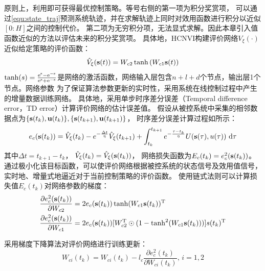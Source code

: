 原则上，利用即可获得最优控制策略。等号右侧的第一项为积分奖赏项，
可以通过\eqref{equ:state_traj}预测系统轨迹，并在求解轨迹上同时对效用函数进行积分以近似$[0:H]$之间的控制代价。
第二项为无穷积分项，无法显式求解。因此本章引入值函数近似的方法以评估未来的积分奖赏项。
具体地，HCNVI构建评价网络$V_\xi(\cdot)$近似给定策略的评价函数：
\begin{equation}
\label{equ:criticNN} \hat { V }_\xi ( \mathbf s(t) ) = W _ { c 2 } \tanh \left( W _
{ c 1 }  \mathbf s(t)  \right)
\end{equation}
$\tanh(s)=\frac{\rm e^{s}-\rm e^{-s}}{\rm e^{s}+\rm
e^{-s}}$是网络的激活函数，网络输入层包含$n+l+d$个节点，输出层1个节点。网络参数
为了保证算法参数更新的实时性，采用系统在线控制过程中产生的增量数据训练网络。
具体地，采用单步时序差分误差（Temporal difference error，TD error）\cite{Sutton2018}计算评价网络的估计误差值。
假设从被控系统中采集的相邻数据点为$\{\mathbf s(t_k), \mathbf u(t_k)\},\{\mathbf s(t_{k+1}), \mathbf u(t_{k+1})\}$，
时序差分误差计算过程如所示：
\begin{equation}
\label{equ:TDerror} e_{c }(\mathbf s(t_k))=\hat{V}_{\xi}(t_k)-e^{-\frac{\Delta t}{\eta}} \hat{V}_{\xi}(t_{k+1})+\int_{t_k}^{t_{k+1}}e^{-\frac{\tau-t_k}{\eta}}U(\mathbf s(\tau), u(\tau))\mathrm{~d} \tau
\end{equation}
其中$\Delta t=t_{k+1}-t_{k}$，
$\hat{V}_{\xi}(t_k)=\hat{V}_{\xi}(\mathbf s(t_k))$，
网络损失函数为$E_c(t_k)=e_c^2(\mathbf s(t_k))$。通过极小化该目标函数，可以使评价网络根据被控系统的状态信号及效用值信号，实时地、增量式地逼近对于当前控制策略的评价函数。
使用链式法则可以计算损失值$E_c(t_k)$对网络参数的梯度：
\begin{equation}
\begin{aligned}
\label{equ:critic_gradient} \dfrac{\partial e_c^2(\mathbf s(t_k))}{\partial
W_{c2}} & =2e_c(\mathbf s(t_k)) \tanh(W_{c1}\mathbf s(t_k))^{\rm T} 
\\ \dfrac{\partial
e_c^2(\mathbf s(t_k))}{\partial W_{c1}} & =2e_c(\mathbf s(t_k)) [W_{c2}^{\rm
T}\odot(1-\tanh^2(W_{c1}\mathbf s(t_k)))]\mathbf {\mathbf} s(t_k)^{\rm T}
\end{aligned}
\end{equation}

采用梯度下降算法对评价网络进行训练更新：
\begin{equation}
\label{equ:train_critic} W_{ci}(t_k)=W_{ci}(t_k)-l_{c} \frac{\partial
e_{c }^{2}(t_k)}{\partial W_{ci}(t_k)}\text{, }i=1,2
\end{equation}

